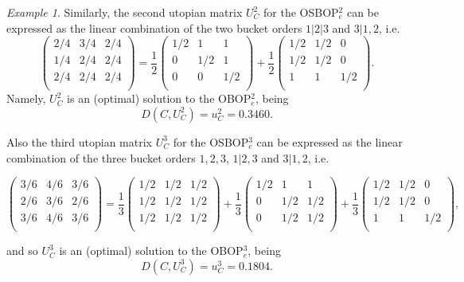 \documentclass[preprint,12pt]{article}
\theoremstyle{definition}
\theoremstyle{remark}
\theoremstyle{example} %
\newtheorem{example}{Example}[section]
\begin{document}
\begin{example}
Similarly, the second utopian matrix $U_C^2$ for the {\rm OSBOP}$^2_e$ can be expressed as the linear combination of the two bucket orders $1|2|3$ and $3|1,2$, i.e.
\[
\left(
  \begin{array}{ccc}
2/4     & 3/4  &  2/4 \\
1/4     & 2/4  &  2/4 \\
2/4     & 2/4  &  2/4 \\
  \end{array}
\right)=\frac{1}{2}\left(
  \begin{array}{ccc}
1/2     & 1  &  1 \\
0     & 1/2  &  1 \\
0     & 0  &  1/2 \\
  \end{array}
\right)
+ \frac{1}{2}\left(
  \begin{array}{ccc}
1/2     & 1/2  &  0 \\
1/2     & 1/2  &  0 \\
1     & 1  &  1/2 \\
  \end{array}
\right).
\]
Namely, $U_C^2$ is an (optimal) solution to the {\rm OBOP}$_e^2$, being 
\[
D(C,U^2_C)=u_C^2=0.3460.
\]

Also the third utopian matrix $U_C^3$ for the {\rm OSBOP}$^3_e$ can be expressed as the linear combination of the three bucket orders  $1,2,3$, $1|2,3$ and $3|1,2$, i.e.
\begin{scriptsize}
\[
\left(
  \begin{array}{ccc}
3/6  & 4/6    &  3/6 \\
2/6  & 3/6    &  2/6  \\
3/6  & 4/6    &  3/6 \\
  \end{array}
\right)=\frac{1}{3}\left(
  \begin{array}{ccc}
1/2 & 1/2   &  1/2 \\
1/2 & 1/2   &  1/2  \\
1/2 & 1/2   &  1/2   \\
  \end{array}
\right)
+ \frac{1}{3}\left(
  \begin{array}{ccc}
1/2     & 1  &  1 \\
0     & 1/2  &  1/2 \\
0     & 1/2  &  1/2 \\
  \end{array}
\right)
+ \frac{1}{3}\left(
  \begin{array}{ccc}
1/2     & 1/2  &  0 \\
1/2     & 1/2  &  0 \\
1     & 1  &  1/2 \\
  \end{array}
\right),
\]
\end{scriptsize}
and so $U_C^3$ is an (optimal) solution to the {\rm OBOP}$_e^3$, being 
\[
D(C,U^3_C)=u_C^3=0.1804.
\]




\end{example}
\end{document}
